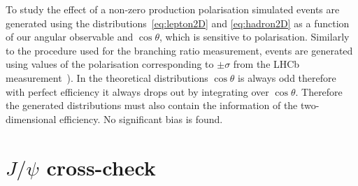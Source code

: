 To study the effect of a non-zero \Lb production polarisation simulated events are generated 
using the distributions~\ref{eq:lepton2D} and \ref{eq:hadron2D} as a function of our angular
observable and $\cos\theta$, which is sensitive to polarisation.
Similarly to the procedure used for the branching ratio measurement, events are generated using
values of the polarisation corresponding to $\pm \sigma$ from the LHCb measurement~\cite{Aaij:2013oxa}).
In the theoretical distributions $\cos \theta$ is always odd therefore with perfect efficiency it always
drops out by integrating over $\cos\theta$. Therefore the generated distributions must also contain
the information of the two-dimensional efficiency. No significant bias is found.





\section{$J/\psi$ cross-check}

